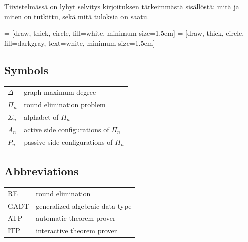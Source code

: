 \documentclass[english, 12pt, a4paper, sci, a-1b, online]{aaltothesis}
\date{2022}
\begin{document}
\makecoverpage{}

\makecopyrightpage{}

\begin{abstractpage}[english]
  \abstracttext{}
\end{abstractpage}

\newpage


\begin{abstractpage}[finnish]
  Tiivistelmässä on lyhyt selvitys
  kirjoituksen tärkeimmästä sisällöstä: mitä ja miten on tutkittu,
  sekä mitä tuloksia on saatu. 
\end{abstractpage}

\thesistableofcontents{}



\newtheorem{theorem}{Theorem}[section]
\newtheorem{lemma}{Lemma}[section]
\newtheorem{corollary}{Corollary}[theorem]

\newcommand{\reline}[1]{\textbf{#1}}

 = [draw, thick, circle, fill=white, minimum size=1.5em]
 = [draw, thick, circle, fill=darkgray, text=white, minimum size=1.5em]

\subsection*{Symbols}

\begin{tabular}{ll}
  $\Delta$ & graph maximum degree \\
  $\Pi_n$    & round elimination problem \\
  $\Sigma_n$ & alphabet of $\Pi_n$ \\
  $A_n$      & active side configurations of $\Pi_n$ \\
  $P_n$      & passive side configurations of $\Pi_n$ \\
\end{tabular}

\subsection*{Abbreviations}

\begin{tabular}{ll}
  RE         & round elimination \\
  GADT       & generalized algebraic data type \\
  ATP        & automatic theorem prover \\
  ITP        & interactive theorem prover
\end{tabular}
\end{document}
